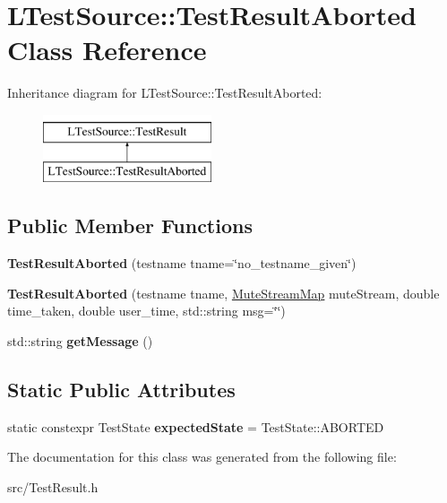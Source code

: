 \hypertarget{class_l_test_source_1_1_test_result_aborted}{\section{L\-Test\-Source\-:\-:Test\-Result\-Aborted Class Reference}
\label{class_l_test_source_1_1_test_result_aborted}
}
Inheritance diagram for L\-Test\-Source\-:\-:Test\-Result\-Aborted\-:\begin{figure}[H]
\begin{center}
\leavevmode
\includegraphics[height=2.000000cm]{class_l_test_source_1_1_test_result_aborted}
\end{center}
\end{figure}
\subsection*{Public Member Functions}
\begin{DoxyCompactItemize}
\item 
\hypertarget{class_l_test_source_1_1_test_result_aborted_af12a190cf2940dacdbba5dd70681882c}{{\bfseries Test\-Result\-Aborted} (testname tname=\char`\"{}no\-\_\-testname\-\_\-given\char`\"{})}\label{class_l_test_source_1_1_test_result_aborted_af12a190cf2940dacdbba5dd70681882c}

\item 
\hypertarget{class_l_test_source_1_1_test_result_aborted_a9fc2bf9cc6ee91ea9a02e32e5c65b740}{{\bfseries Test\-Result\-Aborted} (testname tname, \hyperlink{class_l_test_source_1_1_mute_stream_map}{Mute\-Stream\-Map} mute\-Stream, double time\-\_\-taken, double user\-\_\-time, std\-::string msg=\char`\"{}\char`\"{})}\label{class_l_test_source_1_1_test_result_aborted_a9fc2bf9cc6ee91ea9a02e32e5c65b740}

\item 
\hypertarget{class_l_test_source_1_1_test_result_aborted_aaceeaccd56d29e3091b970d647af0b84}{std\-::string {\bfseries get\-Message} ()}\label{class_l_test_source_1_1_test_result_aborted_aaceeaccd56d29e3091b970d647af0b84}

\end{DoxyCompactItemize}
\subsection*{Static Public Attributes}
\begin{DoxyCompactItemize}
\item 
\hypertarget{class_l_test_source_1_1_test_result_aborted_a80444f6856ee970d540f337780276793}{static constexpr Test\-State {\bfseries expected\-State} = Test\-State\-::\-A\-B\-O\-R\-T\-E\-D}\label{class_l_test_source_1_1_test_result_aborted_a80444f6856ee970d540f337780276793}

\end{DoxyCompactItemize}


The documentation for this class was generated from the following file\-:\begin{DoxyCompactItemize}
\item 
src/Test\-Result.\-h\end{DoxyCompactItemize}
